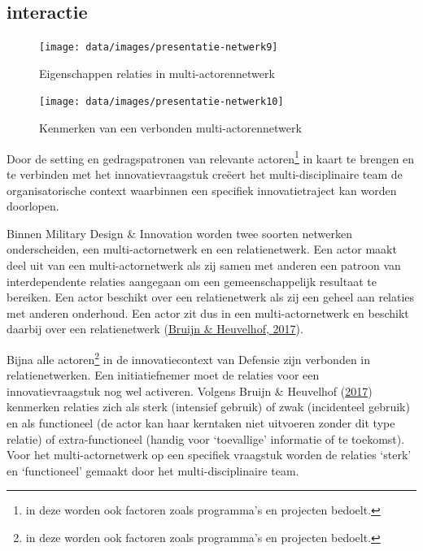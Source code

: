 \documentclass[
]{book}
\begin{document}
\hypertarget{interactie}{%
\subsection{interactie}\label{interactie}}

\begin{figure}

{\centering \texttt{[image: data/images/presentatie-netwerk9]} 

}

\caption{Eigenschappen relaties in multi-actorennetwerk}\label{fig:relaties}
\end{figure}
\begin{figure}

{\centering \texttt{[image: data/images/presentatie-netwerk10]} 

}

\caption{Kenmerken van een verbonden multi-actorennetwerk}\label{fig:verbinding}
\end{figure}

Door de setting en gedragspatronen van relevante actoren\footnote{in deze worden ook factoren zoals programma's en projecten bedoelt.} in kaart te brengen en te verbinden met het innovatievraagstuk creëert het multi-disciplinaire team de organisatorische context waarbinnen een specifiek innovatietraject kan worden doorlopen.

Binnen Military Design \& Innovation worden twee soorten netwerken onderscheiden, een multi-actornetwerk en een relatienetwerk. Een actor maakt deel uit van een multi-actornetwerk als zij samen met anderen een patroon van interdependente relaties aangegaan om een gemeenschappelijk resultaat te bereiken. Een actor beschikt over een relatienetwerk als zij een geheel aan relaties met anderen onderhoud. Een actor zit dus in een multi-actornetwerk en beschikt daarbij over een relatienetwerk (\protect\hyperlink{ref-bruijn2017management}{Bruijn \& Heuvelhof, 2017}).

Bijna alle actoren\footnote{in deze worden ook factoren zoals programma's en projecten bedoelt.} in de innovatiecontext van Defensie zijn verbonden in relatienetwerken. Een initiatiefnemer moet de relaties voor een innovatievraagstuk nog wel activeren. Volgens Bruijn \& Heuvelhof (\protect\hyperlink{ref-bruijn2017management}{2017}) kenmerken relaties zich als sterk (intensief gebruik) of zwak (incidenteel gebruik) en als functioneel (de actor kan haar kerntaken niet uitvoeren zonder dit type relatie) of extra-functioneel (handig voor `toevallige' informatie of te toekomst). Voor het multi-actornetwerk op een specifiek vraagstuk worden de relaties `sterk' en `functioneel' gemaakt door het multi-disciplinaire team.
\end{document}
